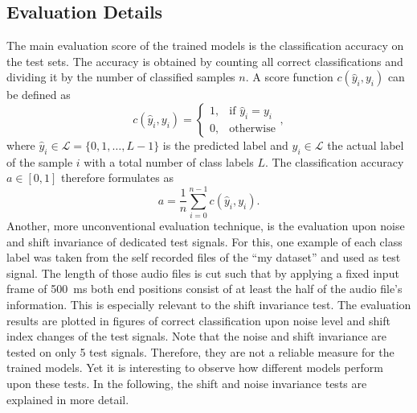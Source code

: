 \subsection{Evaluation Details}\label{sec:exp_details_tb}
The main evaluation score of the trained models is the classification accuracy on the test sets.
The accuracy is obtained by counting all correct classifications and dividing it by the number of classified samples $n$.
A score function $c(\hat{y}_i, y_i)$ can be defined as
\begin{equation}
  c(\hat{y}_i, y_i) = 
  \begin{cases}
    1, & \text{if } \hat{y}_i = y_i\\
    0, & \text{otherwise} 
  \end{cases},
\end{equation}
where $\hat{y}_i \in \mathcal{L} = \{0, 1, \dots, L - 1\} $ is the predicted label and $y_i \in \mathcal{L}$ the actual label of the sample $i$ with a total number of class labels $L$.
The classification accuracy $a \in [0, 1]$ therefore formulates as
\begin{equation}
  a = \frac{1}{n} \sum_{i=0}^{n-1} c(\hat{y}_i, y_i).
\end{equation}
Another, more unconventional evaluation technique, is the evaluation upon noise and shift invariance of dedicated test signals.
For this, one example of each class label was taken from the self recorded files of the \enquote{my dataset} and used as test signal.
The length of those audio files is cut such that by applying a fixed input frame of \SI{500}{\milli\second} both end positions consist of at least the half of the audio file's information.
This is especially relevant to the shift invariance test.
The evaluation results are plotted in figures of correct classification upon noise level and shift index changes of the test signals.
Note that the noise and shift invariance are tested on only 5 test signals.
Therefore, they are not a reliable measure for the trained models.
Yet it is interesting to observe how different models perform upon these tests.
In the following, the shift and noise invariance tests are explained in more detail.



